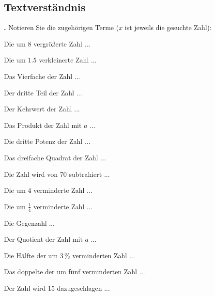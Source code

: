 \newpage

\subsection{Textverständnis}
\textbf{\bbwAufgabenNummer{}.}
Notieren Sie die zugehörigen Terme ($x$ ist jeweils die gesuchte Zahl):


\begin{bbwAufgabenBlock}
\item Die um $8$ vergrößerte Zahl ... 
\item Die um $1.5$ verkleinerte Zahl ... 
\item Das Vierfache der Zahl ... 
\item Der dritte Teil der Zahl ... 
\item Der Kehrwert der Zahl ... 
\item Das Produkt der Zahl mit $a$ ... 
\item Die dritte Potenz der Zahl ... 
\item Das dreifache Quadrat der Zahl ... 
\item Die Zahl wird von 70 subtrahiert ... 
\item Die um $4$ verminderte Zahl ... 
\item Die um $\frac14$ verminderte Zahl ... 
\item Die Gegenzahl ... 
\item Der Quotient der Zahl mit $a$
... 
\item Die Hälfte der um 3\,\% verminderten Zahl
... 
\item Das doppelte der um fünf verminderten Zahl
... 
\item Der Zahl wird 15 dazugeschlagen ... 
\end{bbwAufgabenBlock}

